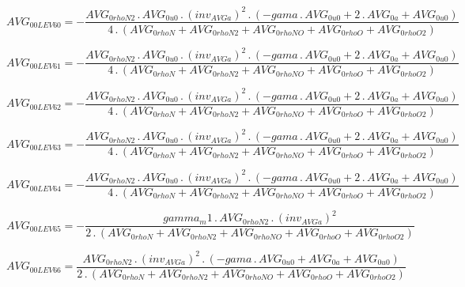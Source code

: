 \documentclass{article}
\begin{document}
\begin{dmath}AVG_{0 0 LEV 60} = - \frac{AVG_{0 rhoN2} \,.\, AVG_{0 u0} \,.\, \left(inv_{AVG a} \right)^{2} \,.\, \left(- gama \,.\, AVG_{0 u0} + 2 \,.\, AVG_{0 a} + AVG_{0 u0}\right)}{4 \,.\, \left(AVG_{0 rhoN} + AVG_{0 rhoN2} + AVG_{0 rhoNO} + 
AVG_{0 rhoO} + AVG_{0 rhoO2}\right)}\end{dmath}

\begin{dmath}AVG_{0 0 LEV 61} = - \frac{AVG_{0 rhoN2} \,.\, AVG_{0 u0} \,.\, \left(inv_{AVG a} \right)^{2} \,.\, \left(- gama \,.\, AVG_{0 u0} + 2 \,.\, AVG_{0 a} + AVG_{0 u0}\right)}{4 \,.\, \left(AVG_{0 rhoN} + AVG_{0 rhoN2} + AVG_{0 rhoNO} + 
AVG_{0 rhoO} + AVG_{0 rhoO2}\right)}\end{dmath}

\begin{dmath}AVG_{0 0 LEV 62} = - \frac{AVG_{0 rhoN2} \,.\, AVG_{0 u0} \,.\, \left(inv_{AVG a} \right)^{2} \,.\, \left(- gama \,.\, AVG_{0 u0} + 2 \,.\, AVG_{0 a} + AVG_{0 u0}\right)}{4 \,.\, \left(AVG_{0 rhoN} + AVG_{0 rhoN2} + AVG_{0 rhoNO} + 
AVG_{0 rhoO} + AVG_{0 rhoO2}\right)}\end{dmath}

\begin{dmath}AVG_{0 0 LEV 63} = - \frac{AVG_{0 rhoN2} \,.\, AVG_{0 u0} \,.\, \left(inv_{AVG a} \right)^{2} \,.\, \left(- gama \,.\, AVG_{0 u0} + 2 \,.\, AVG_{0 a} + AVG_{0 u0}\right)}{4 \,.\, \left(AVG_{0 rhoN} + AVG_{0 rhoN2} + AVG_{0 rhoNO} + 
AVG_{0 rhoO} + AVG_{0 rhoO2}\right)}\end{dmath}

\begin{dmath}AVG_{0 0 LEV 64} = - \frac{AVG_{0 rhoN2} \,.\, AVG_{0 u0} \,.\, \left(inv_{AVG a} \right)^{2} \,.\, \left(- gama \,.\, AVG_{0 u0} + 2 \,.\, AVG_{0 a} + AVG_{0 u0}\right)}{4 \,.\, \left(AVG_{0 rhoN} + AVG_{0 rhoN2} + AVG_{0 rhoNO} + 
AVG_{0 rhoO} + AVG_{0 rhoO2}\right)}\end{dmath}

\begin{dmath}AVG_{0 0 LEV 65} = - \frac{gamma_m1 \,.\, AVG_{0 rhoN2} \,.\, \left(inv_{AVG a} \right)^{2}}{2 \,.\, \left(AVG_{0 rhoN} + AVG_{0 rhoN2} + AVG_{0 rhoNO} + AVG_{0 rhoO} + AVG_{0 rhoO2}\right)}\end{dmath}

\begin{dmath}AVG_{0 0 LEV 66} = \frac{AVG_{0 rhoN2} \,.\, \left(inv_{AVG a} \right)^{2} \,.\, \left(- gama \,.\, AVG_{0 u0} + AVG_{0 a} + AVG_{0 u0}\right)}{2 \,.\, \left(AVG_{0 rhoN} + AVG_{0 rhoN2} + AVG_{0 rhoNO} + AVG_{0 rhoO} + AVG_{0 
rhoO2}\right)}\end{dmath}
\end{document}

